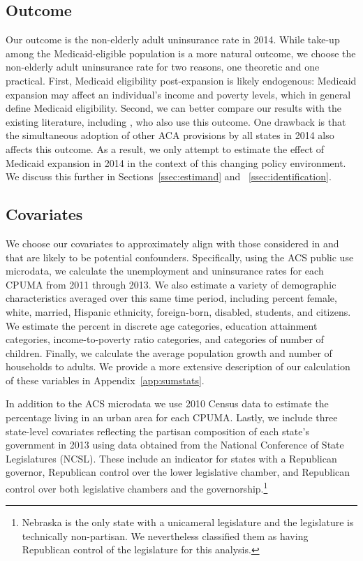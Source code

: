 \documentclass[aoas]{imsart}
\theoremstyle{plain}
\theoremstyle{remark}
\begin{document}
\subsection{Outcome}

Our outcome is the non-elderly adult uninsurance rate in 2014. While take-up among the Medicaid-eligible population is a more natural outcome, we choose the non-elderly adult uninsurance rate for two reasons, one theoretic and one practical. First, Medicaid eligibility post-expansion is likely endogenous: Medicaid expansion may affect an individual's income and poverty levels, which in general define Medicaid eligibility. Second, we can better compare our results with the existing literature, including \cite{courtemanche2017early}, who also use this outcome. One drawback is that the simultaneous adoption of other ACA provisions by all states in 2014 also affects this outcome. As a result, we only attempt to estimate the effect of Medicaid expansion in 2014 in the context of this changing policy environment. We discuss this further in Sections~\ref{ssec:estimand} and ~\ref{ssec:identification}. 

\subsection{Covariates}

We choose our covariates to approximately align with those considered in \cite{courtemanche2017early} and that are likely to be potential confounders. Specifically, using the ACS public use microdata, we calculate the unemployment and uninsurance rates for each CPUMA from 2011 through 2013. We also estimate a variety of demographic characteristics averaged over this same time period, including percent female, white, married, Hispanic ethnicity, foreign-born, disabled, students, and citizens. We estimate the percent in discrete age categories, education attainment categories, income-to-poverty ratio categories, and categories of number of children. Finally, we calculate the average population growth and number of households to adults. We provide a more extensive description of our calculation of these variables in Appendix~\ref{app:sumstats}.

In addition to the ACS microdata we use 2010 Census data to estimate the percentage living in an urban area for each CPUMA. Lastly, we include three state-level covariates reflecting the partisan composition of each state's government in 2013 using data obtained from the National Conference of State Legislatures (NCSL). These include an indicator for states with a Republican governor, Republican control over the lower legislative chamber, and Republican control over both legislative chambers and the governorship.\footnote{Nebraska is the only state with a unicameral legislature and the legislature is technically non-partisan. We nevertheless classified them as having Republican control of the legislature for this analysis.} 
\end{document}
